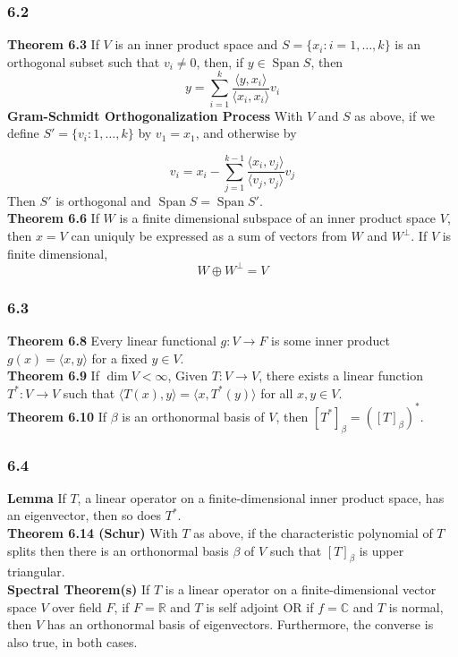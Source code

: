 \documentclass{article}
\DeclareMathOperator{\Span}{Span}
\begin{document}
\subsubsection*{6.2}
\textbf{Theorem 6.3} If $V$ is an inner product space and $S= \{ x_i: i = 1, \ldots, k\}$ is an orthogonal subset such that $v_i \neq 0$, then, if $y \in \Span S$, then $$y = \sum_{i=1}^k\frac{\langle y, x_i\rangle}{\langle x_i, x_i \rangle}v_i$$
\textbf{Gram-Schmidt Orthogonalization Process} With $V$ and $S$ as above, if we define $S' = \{ v_i: 1, \ldots, k\}$ by $v_1 = x_1$, and otherwise by 

$$v_i = x_i - \sum_{j = 1}^{k-1} \frac{\langle x_i, v_j \rangle}{\langle v_j, v_j\rangle} v_j$$
Then $S'$ is orthogonal and $\Span S = \Span S'$. \\ 
\textbf{Theorem 6.6} If $W$ is a finite dimensional subspace of an inner product space $V$, then $x = V$ can uniquly be expressed as a sum of vectors from $W$ and $W^\perp$. If $V$ is finite dimensional, $$ W \oplus W^\perp = V$$
\subsubsection*{6.3}
\textbf{Theorem 6.8} Every linear functional $g:V \to F$ is some inner product $g(x) = \langle x, y\rangle$ for a fixed $y \in V$. \\
\textbf{Theorem 6.9} If $\dim V < \infty$, Given $T: V \to V$, there exists a linear function $T^*: V \to V$ such that $\langle T(x) , y \rangle = \langle x, T^*(y) \rangle $ for all $x, y \in V$. \\
\textbf{Theorem 6.10} If $\beta$ is an orthonormal basis of $V$, then $[T^*]_\beta = ([T]_\beta)^*$. 


\subsubsection*{6.4}
\textbf{Lemma} If $T$, a linear operator on a finite-dimensional inner product space, has an eigenvector, then so does $T^*$. \\
\textbf{Theorem 6.14 (Schur)} With $T$ as above, if the characteristic polynomial of $T$ splits then there is an orthonormal basis $\beta$ of $V$ such that $[T]_\beta$ is upper triangular. \\
\textbf{Spectral Theorem(s)} If $T$ is a linear operator on a finite-dimensional vector space $V$ over field $F$, if $F= \mathbb{R}$ and $T$ is self adjoint OR if $f = \mathbb{C}$ and $T$ is normal, then $V$ has an orthonormal basis of eigenvectors. Furthermore, the converse is also true, in both cases. \\
\end{document}

